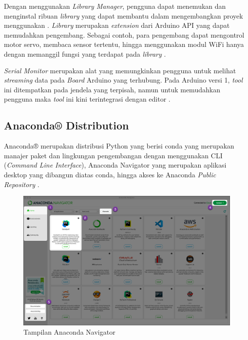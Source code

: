 Dengan menggunakan \emph{Library Manager}, pengguna dapat menemukan dan menginstal ribuan \emph{library} yang dapat membantu dalam mengembangkan proyek menggunakan . \emph{Library} merupakan \emph{extension} dari Arduino API yang dapat memudahkan pengembang. Sebagai contoh, para pengembang dapat mengontrol motor servo, membaca sensor tertentu, hingga menggunakan modul WiFi hanya dengan memanggil fungsi yang terdapat pada \emph{library} \parencite{Söderby_Hylén_2023c}.

\emph{Serial Monitor} merupakan alat yang memungkinkan pengguna untuk melihat \emph{streaming} data pada \emph{Board} Arduino yang terhubung. Pada Arduino versi 1, \emph{tool} ini ditempatkan pada jendela yang terpisah, namun untuk memudahkan pengguna maka \emph{tool} ini kini terintegrasi dengan editor \parencite{Söderby_2023}. 

\subsection{Anaconda® Distribution}

Anaconda® merupakan distribusi Python yang berisi conda yang merupakan manajer paket dan lingkungan pengembangan dengan menggunakan CLI (\emph{Command Line Interface}), Anaconda Navigator yang merupakan aplikasi desktop yang dibangun diatas conda, hingga akses ke Anaconda \emph{Public Repository} \parencite{Inc_2018}.

\begin{figure} [ht] \centering
    \includegraphics[scale=0.262]{gambar/AnacondaNavigatorOverview.png}
    \caption{Tampilan Anaconda Navigator}
    \label{fig:Tampilan Anaconda Navigator}
\end{figure}

